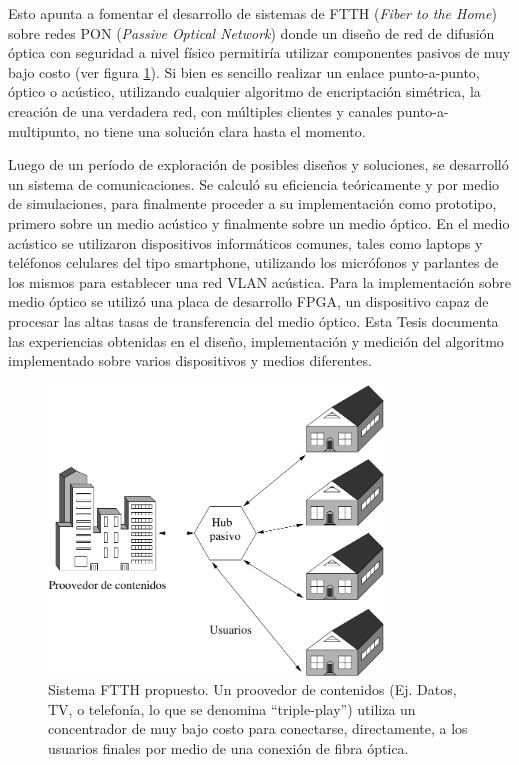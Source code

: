 Esto apunta a fomentar el desarrollo de sistemas de FTTH (\textit{Fiber to the Home}) sobre redes PON (\textit{Passive Optical Network}) \cite{lee2006fiber} donde un diseño de red de difusión óptica con seguridad a nivel físico permitiría utilizar componentes pasivos de muy bajo costo (ver figura \ref{arch:ftth}). Si bien es sencillo realizar un enlace punto-a-punto, óptico o acústico, utilizando cualquier algoritmo de encriptación simétrica, la creación de una verdadera red, con múltiples clientes y canales punto-a-multipunto, no tiene una solución clara hasta el momento.

Luego de un período de exploración de posibles diseños y soluciones, se desarrolló un sistema de comunicaciones. Se calculó su eficiencia teóricamente y por medio de simulaciones, para finalmente proceder a su implementación como prototipo, primero sobre un medio acústico y finalmente sobre un medio óptico. 
En el medio acústico se utilizaron dispositivos informáticos comunes, tales como laptops y teléfonos celulares del tipo smartphone, utilizando los micrófonos y parlantes de los mismos para establecer una red VLAN acústica. 
Para la implementación sobre medio óptico se utilizó una placa de desarrollo FPGA, un dispositivo capaz de procesar las altas tasas de transferencia del medio óptico.
Esta Tesis documenta las experiencias obtenidas en el diseño, implementación y medición del algoritmo implementado sobre varios dispositivos y medios diferentes.

\begin{figure}[!t]
  \centering
    \includegraphics[width=3.5in]{graphs/ftth.pdf}
    \caption{Sistema FTTH propuesto. Un proovedor de contenidos (Ej. Datos, TV, o telefonía, lo que se denomina ``triple-play'') utiliza un concentrador de muy bajo costo para conectarse, directamente, a los usuarios finales por medio de una conexión de fibra óptica.}
    \label{arch:ftth}
\end{figure}

